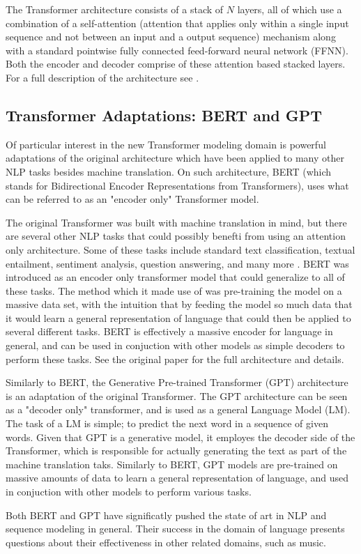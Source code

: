 The Transformer architecture consists of a stack of $N$ layers, all of which use a combination of a self-attention (attention that applies only within a single input sequence and not between an input and a output sequence)  mechanism along with a standard pointwise fully connected feed-forward neural network (FFNN). Both the encoder and decoder comprise of these attention based stacked layers. For a full description of the architecture see \cite{vaswani2017attention}. 

\subsection{Transformer Adaptations: BERT and GPT}
Of particular interest in the new Transformer modeling domain is powerful adaptations of the original architecture which have been applied to many other NLP tasks besides machine translation. On such architecture, BERT (which stands for Bidirectional Encoder Representations from Transformers), uses what can be referred to as an "encoder only" Transformer model. 

The original Transformer was built with machine translation in mind, but there are several other NLP tasks that could possibly benefti from using an attention only architecture. Some of these tasks include standard text classification, textual entailment, sentiment analysis, question answering, and many more . BERT was introduced as an encoder only transformer model that could generalize to all of these tasks. The method which it made use of was pre-training the model on a massive data set, with the intuition that by feeding the model so much data that it would learn a general representation of language that could then be applied to several different tasks. BERT is effectively a massive encoder for language in general, and can be used in conjuction with other models as simple decoders to perform these tasks. See the original paper\cite{devlin2018bert} for the full architecture and details. 

Similarly to BERT, the Generative Pre-trained Transformer (GPT) architecture\cite{radford2019language} is an adaptation of the original Transformer. The GPT architecture can be seen as a "decoder only" transformer, and is used as a general Language Model (LM). The task of a LM is simple; to predict the next word in a sequence of given words. Given that GPT is a generative model, it employes the decoder side of the Transformer, which is responsible for actually generating the text as part of the machine translation taks. Similarly to BERT, GPT models are pre-trained on massive amounts of data to learn a general representation of language, and used in conjuction with other models to perform various tasks. 

Both BERT and GPT have significatly pushed the state of art in NLP and sequence modeling in general. Their success in the domain of language presents questions about their effectiveness in other related domains, such as music. 


 